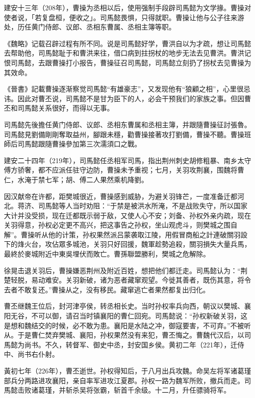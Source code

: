 建安十三年（208年），曹操为丞相以后，使用强制手段辟司馬懿为文学掾。曹操对使者说，「若复盘桓，便收之」。司馬懿畏惧，只得就职。曹操让他与公子往来游处，历任黄门侍郎、议郎、丞相东曹属、丞相主簿等职。

《魏略》记载召辟过程有所不同。说是司馬懿好学，曹洪自以为才疏，想让司馬懿去帮助他，司馬懿耻于和曹洪来往，借口病到拄拐杖的地步无法去见曹洪。曹洪记恨司馬懿，去跟曹操打小报告，曹操征召司馬懿，司馬懿立刻扔了拐杖去见曹操为其效命。

《晉書》記載曹操逐渐察觉司馬懿“有雄豪志”，又发现他有“狼顧之相”，心里很忌讳。因此对曹丕说，司馬懿不是甘为臣下的人，必会干预我们的家族之事。但因曹丕和司馬懿关系很好，而得以无事。

司馬懿先後擔任黄门侍郎、议郎、丞相东曹属和丞相主簿，并跟隨曹操征討張魯。司馬懿見劉備剛剛奪取益州，腳跟未穩，勸曹操接著攻打劉備，曹操不聽。曹操班師后司馬懿跟隨曹操參加第三次濡須口之戰。

建安二十四年（219年），司馬懿任丞相军司馬，指出荆州刺史胡修粗暴、南乡太守傅方骄奢，都不应派任驻守边防，曹操未予重视；七月，关羽攻荆襄，围魏将曹仁，水淹于禁七军；胡、傅二人果然乘机降劉。

因汉献帝在许都，距樊城很近，曹操感到威胁，为避关羽锋芒，一度准备迁都河北。蒋济、司馬懿等人当时劝阻：“于禁是被洪水所淹，不是战败失守，所以国家大计并没受损，现在迁都既示弱于敌，又使人心不安；刘备、孙权外亲内疏，现在关羽得意，孙权必定更不高兴，把这事告之孙权，坐山观虎斗，则樊城之围自解”。曹操听从他的计策，孙权果然派吕蒙袭取江陵，用假冒商船之計連破關羽設下的烽火台，攻佔眾多城池，关羽只好回援，魏軍趁勢追殺，關羽損失大量兵馬，最終於麥城附近中東吳埋伏而敗亡。曹孫聯盟勝利，樊城之危解除。

徐晃击退关羽后，曹操嫌恶荆州及附近百姓，想把他们都迁走。司馬懿认为：“荆楚轻脱，易动难安。关羽新破，诸为恶者藏窜观望。今徙其善者，既伤其意，将令去者不敢复还。”曹操从之，没有移民。藏窜逃亡者果然都复出归化。

曹丕继魏王位后，封河津亭侯，转丞相长史。当时孙权率兵向西，朝议以樊城、襄阳无谷，不可以御，请召当时镇襄阳的曹仁回宛。司馬懿说：“孙权新破关羽，这是想和魏结交的时候，必不敢为患。襄阳是水陆之冲，御寇要害，不可弃。”不被听从。于是曹仁焚弃樊城、襄阳，孙权果然没有来犯，曹丕悔之。曹魏代汉后，以司馬懿为尚书。不久，转督军、御史中丞，封安国乡侯。黄初二年（221年），迁侍中、尚书右仆射。

黃初七年（226年），曹丕逝世。孙权得知后，于八月出兵攻魏。命吴左将军诸葛瑾部兵分两路进攻襄阳，亲自率军进攻江夏郡。孙权一路为魏军所败，撤兵而走。司馬懿击败诸葛瑾，并斩杀吴将张霸，斩首千余级。十二月，升任骠骑将军。

